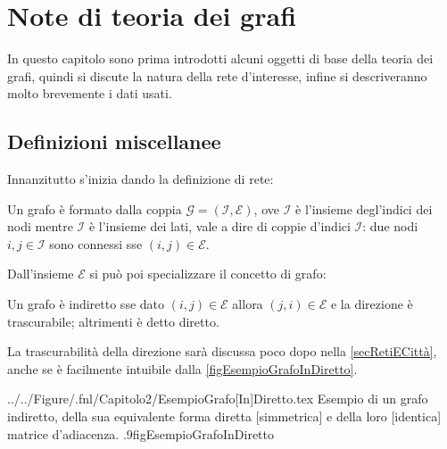 

\chapter{Note di teoria dei grafi}\label{secTeoriaGrafi}

    In questo capitolo sono prima introdotti alcuni oggetti di base della teoria dei grafi, quindi si discute la natura della rete d'interesse, infine si descriveranno molto brevemente i dati usati.

    \section{Definizioni miscellanee}\label{secDefinizioniGrafi}

        Innanzitutto s'inizia dando la definizione di rete:
        
        \begin{dfn}[Grafo]
            \label{defGrafo}
            Un grafo è formato dalla coppia \(\mathcal G=(\mathcal I,\mathcal E)\), ove \(\mathcal I\) è l'insieme degl'indici dei nodi mentre \(\mathcal I\) è l'insieme dei lati, vale a dire di coppie d'indici \(\mathcal I\): due nodi \(i,j\in\mathcal I\) sono connessi sse \((i,j)\in\mathcal E\).
        \end{dfn}
        
        Dall'insieme \(\mathcal E\) si può poi specializzare il concetto di grafo:
        
        \begin{dfn}
            \label{defGrafoInDiretto}
            Un grafo è indiretto sse dato \((i,j)\in\mathcal E\) allora \((j,i)\in\mathcal E\) e la direzione è trascurabile; altrimenti è detto diretto.
        \end{dfn}
        
        La trascurabilità della direzione sarà discussa poco dopo nella \cref{secRetiECittà}, anche se è facilmente intuibile dalla \cref{figEsempioGrafoInDiretto}.

            {../../Figure/.fnl/Capitolo2/EsempioGrafo[In]Diretto.tex}
            {Esempio di un grafo indiretto, della sua equivalente forma diretta [simmetrica] e della loro [identica] matrice d'adiacenza.}
            {.9\linewidth}{figEsempioGrafoInDiretto}
        
